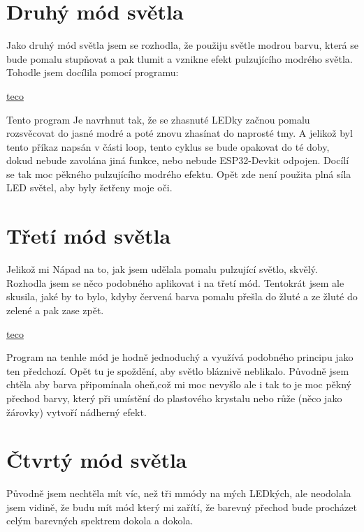 \section{Druhý mód světla}
Jako druhý mód světla jsem se rozhodla, že použiju světle modrou barvu, která se bude pomalu stupňovat a pak tlumit a vznikne efekt pulzujícího modrého světla. Tohodle jsem docílila pomocí programu: 

\href{https://www.tecomat.cz/products/}{teco}

%


Tento program Je navrhnut tak, že se zhasnuté LEDky začnou pomalu rozsvěcovat do jasné modré a poté znovu zhasínat do naprosté tmy. A jelikož byl tento příkaz napsán v části loop, tento cyklus se bude opakovat do té doby, dokud nebude zavolána jiná funkce, nebo nebude ESP32-Devkit odpojen. Docílí se tak moc pěkného pulzujícího modrého efektu. Opět zde není použita plná síla LED světel, aby byly šetřeny moje oči.  


\section{Třetí mód světla}
Jelikož mi Nápad na to, jak jsem udělala pomalu pulzující světlo, skvělý. Rozhodla jsem se něco podobného aplikovat i na třetí mód. Tentokrát jsem ale skusila, jaké by to bylo, kdyby červená barva pomalu přešla do žluté a ze žluté do zelené a pak zase zpět. 

\href{https://www.tecomat.cz/products/}{teco}

%


Program na tenhle mód je hodně jednoduchý a využívá podobného principu jako ten předchozí. Opět tu je spoždění, aby světlo bláznivě neblikalo. Původně jsem chtěla aby barva připomínala oheň,což mi moc nevyšlo ale i tak to je moc pěkný přechod barvy, který při umístění do plastového krystalu nebo růže (něco jako žárovky) vytvoří nádherný efekt.


\section{Čtvrtý mód světla}
Původně jsem nechtěla mít víc, než tři mmódy na mých LEDkých, ale neodolala jsem vidině, že budu mít mód který mi zařítí, že barevný přechod bude procházet celým barevných spektrem  dokola a dokola. 

